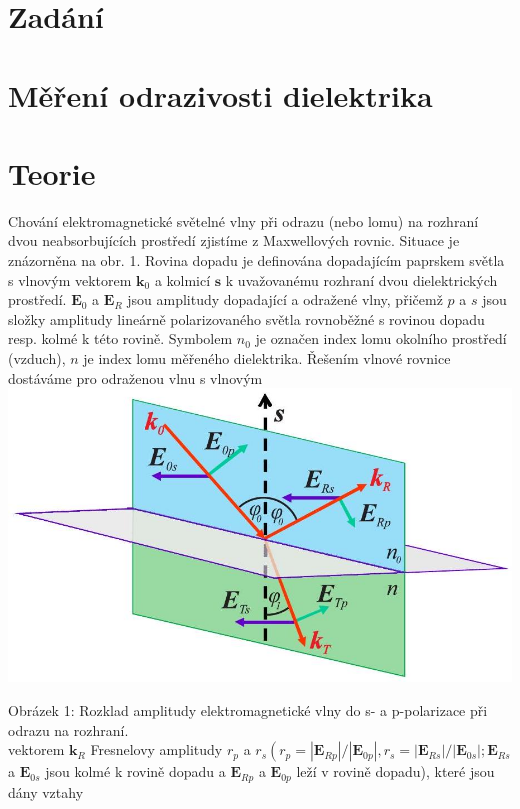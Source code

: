 \documentclass[czech,11pt,a4paper]{article}
\begin{document}
	\begin{multicols}{2}
		\section{Zadání}
		
		\section*{Měření odrazivosti dielektrika}
		\section*{Teorie}
		Chování elektromagnetické světelné vlny při odrazu (nebo lomu) na rozhraní dvou neabsorbujících prostředí zjistíme z Maxwellových rovnic. Situace je znázorněna na obr. 1. Rovina dopadu je definována dopadajícím paprskem světla s vlnovým vektorem $\boldsymbol{k}_{0}$ a kolmicí $\boldsymbol{s}$ k uvažovanému rozhraní dvou dielektrických prostředí. $\boldsymbol{E}_{0}$ a $\boldsymbol{E}_{R}$ jsou amplitudy dopadající a odražené vlny, přičemž $p$ a $s$ jsou složky amplitudy lineárně polarizovaného světla rovnoběžné s rovinou dopadu resp. kolmé k této rovině. Symbolem $n_{0}$ je označen index lomu okolního prostředí (vzduch), $n$ je index lomu měřeného dielektrika. Řešením vlnové rovnice dostáváme pro odraženou vlnu s vlnovým\\
		\includegraphics[max width=0.95\linewidth, center]{2024_11_19_160a1389244899f42734g-1}
		
		Obrázek 1: Rozklad amplitudy elektromagnetické vlny do s- a p-polarizace při odrazu na rozhraní.\\
		vektorem $\boldsymbol{k}_{R}$ Fresnelovy amplitudy $r_{p}$ a $r_{s}\left(r_{p}=\left|\boldsymbol{E}_{R p}\right| /\left|\boldsymbol{E}_{0 p}\right|, r_{s}=\left|\boldsymbol{E}_{R s}\right| /\left|\boldsymbol{E}_{0 s}\right| ; \boldsymbol{E}_{R s}\right.$ a $\boldsymbol{E}_{0 s}$ jsou kolmé k rovině dopadu a $\boldsymbol{E}_{R p}$ a $\boldsymbol{E}_{0 p}$ leží v rovině dopadu), které jsou dány vztahy
		

\end{multicols}
\end{document}
